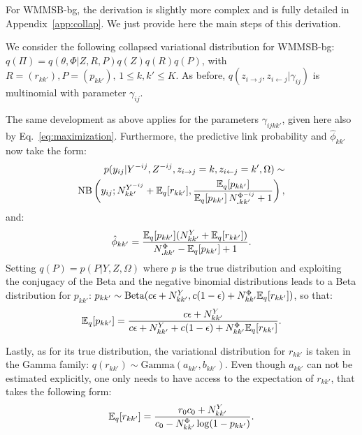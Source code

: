 For WMMSB-bg, the derivation is slightly more complex and is fully detailed in Appendix~\ref{app:collap}. We just provide here the main steps of this derivation.

We consider the following collapsed variational distribution for WMMSB-bg: $q(\Pi) = q(\theta, \Phi|Z, {R}, P)q(Z)q({R})q(P)$,
with ${R}=(r_{kk'}), P=(p_{kk'}), \, 1 \le k,k' \le K$. As before, $q(z_{i \rightarrow j}, z_{i \leftarrow j}|\gamma_{ij})$ is multinomial with parameter $\gamma_{ij}$.

The same development as above applies for the parameters $\gamma_{ijkk'}$, given here also by Eq.~\ref{eq:maximization}. Furthermore, the predictive link probability and $\hat \phi_{kk'}$ now take the form:
%
\begin{align*}
p(y_{ij} | {Y}^{-ij}, Z^{- ij}, z_{i\rightarrow j}=k, z_{i\leftarrow j}=k',\Omega) \sim \\
\mathrm{NB}\left(y_{ij}; N^{{Y}^{-ij}}_{kk'} + \mathbb{E}_{q}[r_{kk'}], \frac{\mathbb{E}_{q}[p_{kk'}]}{\mathbb{E}_{q}[p_{kk'}]\,N^{\Phi^{-ij}}_{\bm{.}kk'} + 1} \right),
\end{align*}
%
and:
%
\begin{align*}
\hat \phi_{kk'} = \frac{\mathbb{E}_{q}[p_{kk'}](N^{Y}_{kk'} + \mathbb{E}_{q}[r_{kk'}])}{N^{\Phi}_{\bm{.}kk'} - \mathbb{E}_{q}[p_{kk'}] + 1}.
\end{align*}
%
Setting $q({P}) = p({P}|{Y},Z,\Omega)$ where $p$ is the true distribution and exploiting the conjugacy of the Beta and the negative binomial distributions leads to a Beta distribution for $p_{kk'}$: $p_{kk'} \sim \textrm{Beta}(c\epsilon + N^{Y}_{kk'}, c(1-\epsilon) + N^\Phi_{kk'}\mathbb{E}_{q}[r_{kk'}])$,
so that:
\[
\mathbb{E}_{q}[p_{kk'}] = \frac{c\epsilon + N^{Y}_{kk'}}{c\epsilon + N^{Y}_{kk'} + c(1-\epsilon) + N^\Phi_{kk'}\mathbb{E}_{q}[r_{kk'}]}.
\]

Lastly, as for its true distribution, the variational distribution for $r_{kk'}$ is taken in the Gamma family:  $q(r_{kk'}) \sim \textrm{Gamma}(a_{kk'},b_{kk'})$. Even though $a_{kk'}$ can not be estimated explicitly, one only needs to have access to the expectation of $r_{kk'}$, that takes the following form:
\[
\mathbb{E}_{q}[r_{kk'}] = \frac{r_0c_0+N^{Y}_{kk'}}{c_0  -N^\Phi_{kk'}\log(1-p_{kk'})}.
\]
%

